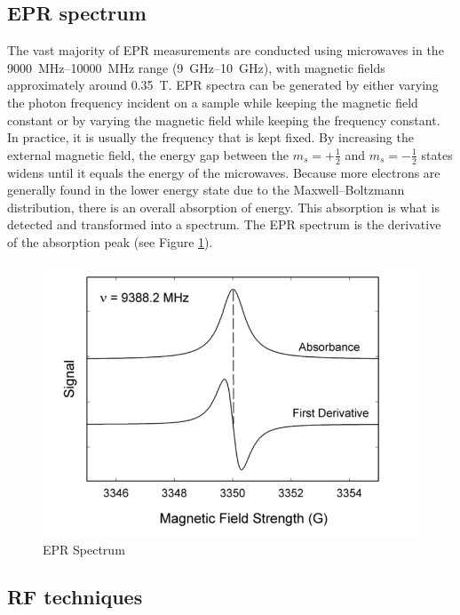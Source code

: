 \documentclass{article}
\begin{document}
\subsection{EPR spectrum}
The vast majority of EPR measurements are conducted using microwaves in the \SIrange{9000}{10000}{MHz} range (\SIrange{9}{10}{GHz}), with magnetic fields approximately around \SI{0.35}{T}. EPR spectra can be generated by either varying the photon frequency incident on a sample while keeping the magnetic field constant or by varying the magnetic field while keeping the frequency constant. In practice, it is usually the frequency that is kept fixed. By increasing the external magnetic field, the energy gap between the  $m_s = +\frac{1}{2}$ and  $m_s = -\frac{1}{2}$ states widens until it equals the energy of the microwaves. Because more electrons are generally found in the lower energy state due to the Maxwell–Boltzmann distribution, there is an overall absorption of energy. This absorption is what is detected and transformed into a spectrum. The EPR spectrum is the derivative of the absorption peak (see Figure \ref{fig:eprspectrum}). 
\begin{figure}[h]
    \centering
    \includegraphics[width=0.5\linewidth]{Figures/Intro/2.png}
    \caption{EPR Spectrum \cite{wikipediacontributors_2019_electron}}
    \label{fig:eprspectrum}
\end{figure}


\subsection{RF techniques}
\end{document}
